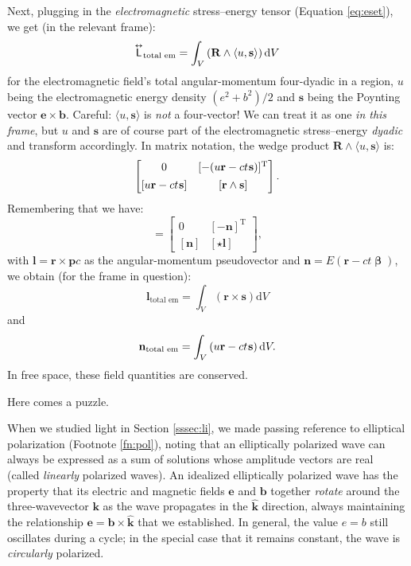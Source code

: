 \documentclass[12pt]{article}
\renewcommand{\vv}[1]{\mathbf{#1}}
\newcommand{\dd}[1]{\mathrm{d}#1}
\newcommand{\vvbeta}{\bm{\upbeta}}
\newcommand{\capdy}[1]{ \overset{ \text{\tiny$\bm\leftrightarrow$} }{\vphantom{\text{\small{A}}}\smash{#1}} }
\begin{document}
Next, plugging in the \emph{electromagnetic} stress--energy tensor (Equation \ref{eq:eset}), we get (in the relevant frame):
\begin{equation*}
\capdy{\mathsf{L}}_{\textrm{total em}} = \int_V \left( \vv R \wedge \langle u, \vv s \rangle \right) \dd V
\end{equation*}
for the electromagnetic field's total angular-momentum four-dyadic in a region, $u$ being the electromagnetic energy density $(e^2 + b^2)/2$ and $\vv s$ being the Poynting vector $\vv e \times \vv b$. Careful: $\langle u, \vv s \rangle$ is \emph{not} a four-vector! We can treat it as one \emph{in this frame}, but $u$ and $\vv s$ are of course part of the electromagnetic stress--energy \emph{dyadic} and transform accordingly. In matrix notation, the wedge product $\vv R \wedge \langle u, \vv s \rangle$ is:
\begin{equation*}
\begin{bmatrix}
0 & [ - (u \vv r - ct \mkern1mu \vv s ) ]^\mathrm{T} \\[1ex]
[ u \vv r - ct \mkern1mu \vv s ] & [ \vv r \wedge \vv s ]
\end{bmatrix} .
\end{equation*}
Remembering that we have:
\begin{equation*}
[ \capdy{\mathsf{L}} ]
=
\begin{bmatrix}
0 & [ - \vv n ]^\mathrm{T} \\[1ex]
[ \vv n ] & [ \star \vv l ]
\end{bmatrix} ,
\end{equation*}
with $\vv l = \vv r \times \vv pc$ as the angular-momentum pseudovector and $\vv n = E (  \vv r - ct \vvbeta )$, we obtain (for the frame in question):
\begin{equation*}
\vv l_{\textrm{total em}} = \int_V \left( \vv r \times \vv s \right) \dd V
\end{equation*}
and
\begin{equation*}
\vv n_{\textrm{total em}} = \int_V \left( u \vv r - ct \mkern1mu \vv s \right) \dd V.
\end{equation*}
In free space, these field quantities are conserved.

Here comes a puzzle.

When we studied light in Section \ref{sssec:li}, we made passing reference to elliptical polarization (Footnote \ref{fn:pol}), noting that an elliptically polarized wave can always be expressed as a sum of solutions whose amplitude vectors are real (called \emph{linearly} polarized waves). An idealized elliptically polarized wave has the property that its electric and magnetic fields $\vv e$ and $\vv b$ together \emph{rotate} around the three-wavevector $\vv k$ as the wave propagates in the $\vv{\hat k}$ direction, always maintaining the relationship $\vv e = \vv b \times \vv{\hat k}$ that we established. In general, the value $e = b$ still oscillates during a cycle; in the special case that it remains constant, the wave is \emph{circularly} polarized.
\end{document}
